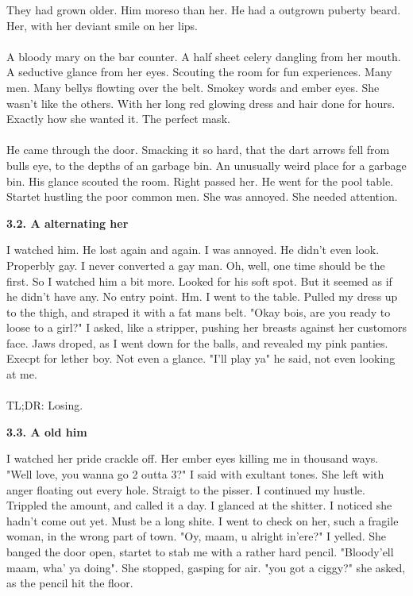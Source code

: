 \documentclass[]{article}
\begin{document}
They had grown older. Him moreso than her. He had a outgrown puberty beard. Her, with her deviant smile on her lips. 
\\ \\
A bloody mary on the bar counter. A half sheet celery dangling from her mouth. A seductive glance from her eyes. Scouting the room for fun experiences. Many men. Many bellys flowting over the belt. Smokey words and ember eyes. She wasn't like the others. With her long red glowing dress and hair done for hours. Exactly how she wanted it. The perfect mask. 
\\ \\
He came through the door. Smacking it so hard, that the dart arrows fell from bulls eye, to the depths of an garbage bin. An unusually weird place for a garbage bin. His glance scouted the room. Right passed her. He went for the pool table. Startet hustling the poor common men. She was annoyed. She needed attention. 

\begin{center}
	\textbf{3.2. A alternating her}
\end{center}

I watched him. He lost again and again. I was annoyed. He didn't even look. Properbly gay. I never converted a gay man. Oh, well, one time should be the first. So I watched him a bit more. Looked for his soft spot. But it seemed as if he didn't have any. No entry point. Hm. I went to the table. Pulled my dress up to the thigh, and straped it with a fat mans belt. "Okay bois, are you ready to loose to a girl?" I asked, like a stripper, pushing her breasts against her customors face. Jaws droped, as I went down for the balls, and revealed my pink panties. Execpt for lether boy. Not even a glance. "I'll play ya" he said, not even looking at me. 
\\ \\
TL;DR: Losing.

\begin{center}
	\textbf{3.3. A old him}
\end{center}

I watched her pride crackle off. Her ember eyes killing me in thousand ways. "Well love, you wanna go 2 outta 3?" I said with exultant tones. She left with anger floating out every hole. Straigt to the pisser. I continued my hustle. Trippled the amount, and called it a day. I glanced at the shitter. I noticed she hadn't come out yet. Must be a long shite. I went to check on her, such a fragile woman, in the wrong part of town. "Oy, maam, u alright in'ere?" I yelled. She banged the door open, startet to stab me with a rather hard pencil. "Bloody'ell maam, wha' ya doing". She stopped, gasping for air. "you got a ciggy?" she asked, as the pencil hit the floor. 
\end{document}

